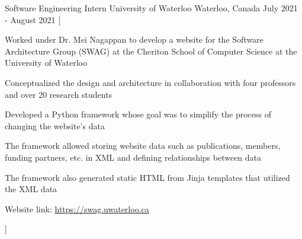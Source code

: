 \begin{cventries}
  \cventry
    {Software Engineering Intern} %
    {University of Waterloo} %
    {Waterloo, Canada} %
    {July 2021 - August 2021} %
    [
      \begin{cvitems} %
        \item {Worked under Dr. Mei Nagappan to develop a website for the Software Architecture Group (SWAG) at the Cheriton School of Computer Science at the University of Waterloo}
        \item {Conceptualized the design and architecture in collaboration with four professors and over 20 research students}
        \item {Developed a Python framework whose goal was to simplify the process of changing the website's data}
        \item {The framework allowed storing website data such as publications, members, funding partners, etc. in XML and defining relationships between data}
        \item {The framework also generated static HTML from Jinja templates that utilized the XML data}
        \item {Website link: \href{https://swag.uwaterloo.ca}{https://swag.uwaterloo.ca}}
      \end{cvitems}
    ]


\end{cventries}
